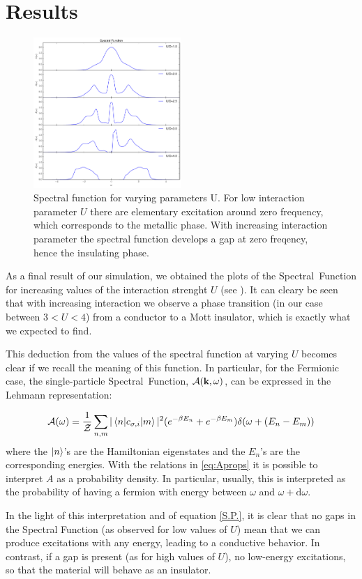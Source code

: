 \section{Results}
\begin{figure}[ht]
	\centering
	\includegraphics[width=0.5\textwidth ]{Mott_transition}
	\caption{Spectral function for varying parameters U. For low interaction parameter $U$ there are elementary excitation around zero frequency, which corresponds to the metallic phase. With increasing interaction parameter the spectral function develops a gap at zero freqency, hence the insulating phase.}
	\label{fig:spectralf}
\end{figure}
As a final result of our simulation, we obtained the plots of the Spectral~Function for increasing values of the interaction strenght $U$ (see ).
It can cleary be seen that with increasing interaction we observe a phase transition (in our case between $3<U<4$) from a conductor to a Mott insulator, which is exactly what we expected to find. 

This deduction from the values of the spectral function at varying $U$ becomes clear if we recall the meaning of this function.  
In particular, for the Fermionic case, the single-particle Spectral~Function, $\mathcal{A(\bold{k},\omega)}$, can be expressed in the Lehmann representation: 

\begin{equation}\label{S.P.}
  \mathcal{A}(\omega) = \frac{1}{\mathcal{Z}}\sum_{n,m}|\braket{n|c_{\bold{\sigma},i}|m}|^2 (e^{-\beta E_n} + e^{-\beta E_m})\delta(\omega+(E_n-E_m))
\end{equation}
where the $\ket{n}$'s are the Hamiltonian eigenstates and the $E_n$'s are the corresponding energies. 
With the relations in \eqref{eq:Aprops} it is possible to interpret $A$ as a probability density. In particular, usually, this is interpreted as the probability of having a fermion with energy between $\omega$ and $\omega + \mathrm{d}\omega$.

In the light of this interpretation and of equation \eqref{S.P.}, it is clear that no gaps in the Spectral Function (as observed for low values of $U$) mean that we can produce excitations with any energy, leading to a conductive behavior. In contrast, if a gap is present (as for high values of $U$), no low-energy excitations, so that the material will behave as an insulator.


\clearpage
